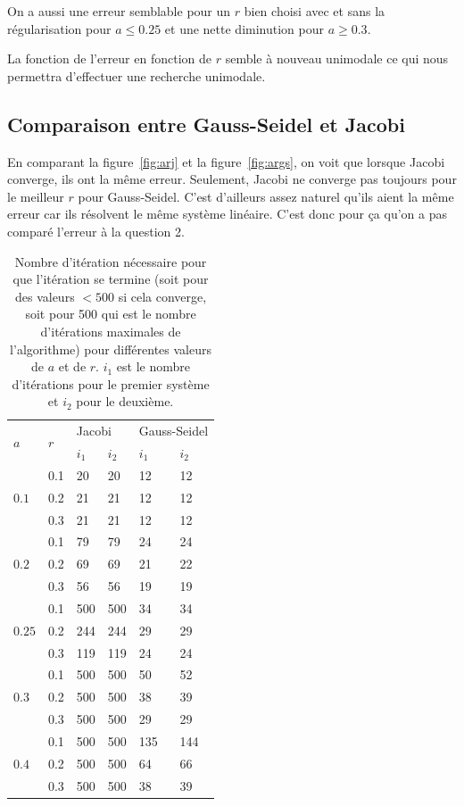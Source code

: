 On a aussi une erreur semblable pour un $r$ bien choisi
avec et sans la régularisation pour $a \leq 0.25$ et une nette
diminution pour $a \geq 0.3$.

La fonction de l'erreur en fonction de $r$ semble à nouveau unimodale
ce qui nous permettra d'effectuer une recherche unimodale.

\subsection{Comparaison entre Gauss-Seidel et Jacobi}
En comparant la figure~\ref{fig:arj} et la figure~\ref{fig:args}, on voit
que lorsque Jacobi converge, ils ont la même erreur.
Seulement, Jacobi ne converge pas toujours pour le meilleur $r$ pour Gauss-Seidel.
C'est d'ailleurs assez naturel qu'ils aient la même erreur car ils résolvent le même
système linéaire.
C'est donc pour ça qu'on a pas comparé l'erreur à la question 2.


\begin{table}
  \centering
  \begin{tabular}{|l|l|l|l|l|l|}
    \hline
    \multirow{2}{*}{$a$} & \multirow{2}{*}{$r$} & \multicolumn{2}{l|}{Jacobi} & \multicolumn{2}{l|}{Gauss-Seidel}\\
    \cline{3-6}
      &  & $i_1$ & $i_2$ & $i_1$ & $i_2$\\
    \hline
    \multirow{3}{*}{$0.1$} & 0.1 & 20 & 20 & 12 & 12 \\
    \cline{2-6}
      & 0.2 & 21 & 21 & 12 & 12 \\
      \cline{2-6}
      & 0.3 & 21 & 21 & 12 & 12 \\
    \hline
    \multirow{3}{*}{$0.2$} & 0.1 & 79 & 79 & 24 & 24 \\
    \cline{2-6}
      & 0.2 & 69 & 69 & 21 & 22 \\
      \cline{2-6}
      & 0.3 & 56 & 56 & 19 & 19 \\
    \hline
    \multirow{3}{*}{$0.25$} & 0.1 & 500 & 500 & 34 & 34 \\
    \cline{2-6}
      & 0.2 & 244 & 244 & 29 & 29 \\
      \cline{2-6}
      & 0.3 & 119 & 119 & 24 & 24\\
    \hline
    \multirow{3}{*}{$0.3$} & 0.1 & 500 & 500 & 50 & 52 \\
    \cline{2-6}
      & 0.2 & 500 & 500 & 38 & 39 \\
      \cline{2-6}
      & 0.3 & 500 & 500 & 29 & 29 \\
      \hline
      \multirow{3}{*}{$0.4$} & 0.1 & 500 & 500 & 135 & 144 \\
    \cline{2-6}
      & 0.2 & 500 & 500 & 64 & 66 \\
      \cline{2-6}
      & 0.3 & 500 & 500 & 38 & 39 \\
      \hline
  \end{tabular}
  \caption{Nombre d'itération nécessaire pour que l'itération se termine (soit pour des valeurs $<500$ si cela converge, soit pour 500 qui est le nombre d'itérations maximales de l'algorithme) pour différentes valeurs de $a$ et de $r$.
  $i_1$ est le nombre d'itérations pour le premier système et $i_2$ pour le deuxième.}
  \label{tab:iterQ3JvsGS}
\end{table}


